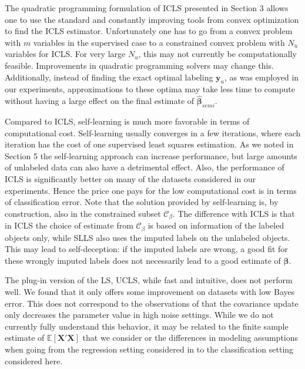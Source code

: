 \documentclass[smallcondensed]{svjour3}
\newcommand{\Cb}{\mathcal{C}_{\beta}}
\begin{document}
The quadratic programming formulation of ICLS presented in Section 3 allows one to use the standard and constantly improving tools from convex optimization to find the ICLS estimator. Unfortunately one has to go from a convex problem with $m$ variables in the supervised case to a constrained convex problem with $N_u$ variables for ICLS. For very large $N_u$, this may not currently be computationally feasible. Improvements in quadratic programming solvers may change this. Additionally, instead of finding the exact optimal labeling $\mathbf{y}_u$, as was employed in our experiments, approximations to these optima may take less time to compute without having a large effect on the final estimate of $\boldsymbol{\hat{\beta}}_{semi}$.

Compared to ICLS, self-learning is much more favorable in terms of computational cost. Self-learning usually converges in a few iterations, where each iteration has the cost of one supervised least squares estimation. As we noted in Section 5 the self-learning approach can increase performance, but large amounts of unlabeled data can also have a detrimental effect. Also, the performance of ICLS is significantly better on many of the datasets considered in our experiments. Hence the price one pays for the low computational cost is in terms of classification error. Note that the solution provided by self-learning is, by construction, also in the constrained subset $\Cb$. The difference with ICLS is that in ICLS the choice of estimate from $\Cb$ is based on information of the labeled objects only, while SLLS also uses the imputed labels on the unlabeled objects. This may lead to self-deception: if the imputed labels are wrong, a good fit for these wrongly imputed labels does not necessarily lead to a good estimate of $\boldsymbol{\beta}$.

The plug-in version of the LS, UCLS, while fast and intuitive, does not perform well. We found that it only offers some improvement on datasets with low Bayes error. This does not correspond to the observations of \cite{Shaffer1991} that the covariance update only decreases the parameter value in high noise settings. While we do not currently fully understand this behavior, it may be related to the finite sample estimate of $\mathbb{E}[\mathbf{X}'\mathbf{X}]$ that we consider or the differences in modeling assumptions when going from the regression setting considered in \cite{Shaffer1991} to the classification setting considered here.
\end{document}
